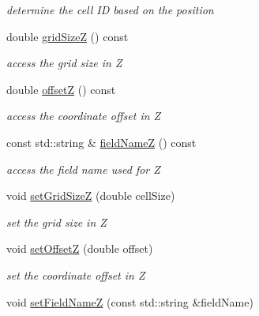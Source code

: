\begin{DoxyCompactItemize}
\begin{DoxyCompactList}\small\item\em determine the cell ID based on the position \item\end{DoxyCompactList}\item 
double \hyperlink{class_d_d4hep_1_1_d_d_segmentation_1_1_cartesian_grid_x_y_z_ac9b1044765b985e8505bd84880fab38b}{gridSizeZ} () const 
\begin{DoxyCompactList}\small\item\em access the grid size in Z \item\end{DoxyCompactList}\item 
double \hyperlink{class_d_d4hep_1_1_d_d_segmentation_1_1_cartesian_grid_x_y_z_a747dfb49d7ca0ee30c04f5f4229b1972}{offsetZ} () const 
\begin{DoxyCompactList}\small\item\em access the coordinate offset in Z \item\end{DoxyCompactList}\item 
const std::string \& \hyperlink{class_d_d4hep_1_1_d_d_segmentation_1_1_cartesian_grid_x_y_z_ab761fdf829436e7be5089a3638227e87}{fieldNameZ} () const 
\begin{DoxyCompactList}\small\item\em access the field name used for Z \item\end{DoxyCompactList}\item 
void \hyperlink{class_d_d4hep_1_1_d_d_segmentation_1_1_cartesian_grid_x_y_z_a1350853bf74f0de0d12b1fa1bf9c1f09}{setGridSizeZ} (double cellSize)
\begin{DoxyCompactList}\small\item\em set the grid size in Z \item\end{DoxyCompactList}\item 
void \hyperlink{class_d_d4hep_1_1_d_d_segmentation_1_1_cartesian_grid_x_y_z_a1026999b123d8140f6e710abf9977cef}{setOffsetZ} (double offset)
\begin{DoxyCompactList}\small\item\em set the coordinate offset in Z \item\end{DoxyCompactList}\item 
void \hyperlink{class_d_d4hep_1_1_d_d_segmentation_1_1_cartesian_grid_x_y_z_a80a938d9852e6dcca0b81365b347f6ea}{setFieldNameZ} (const std::string \&fieldName)

\end{DoxyCompactItemize}
